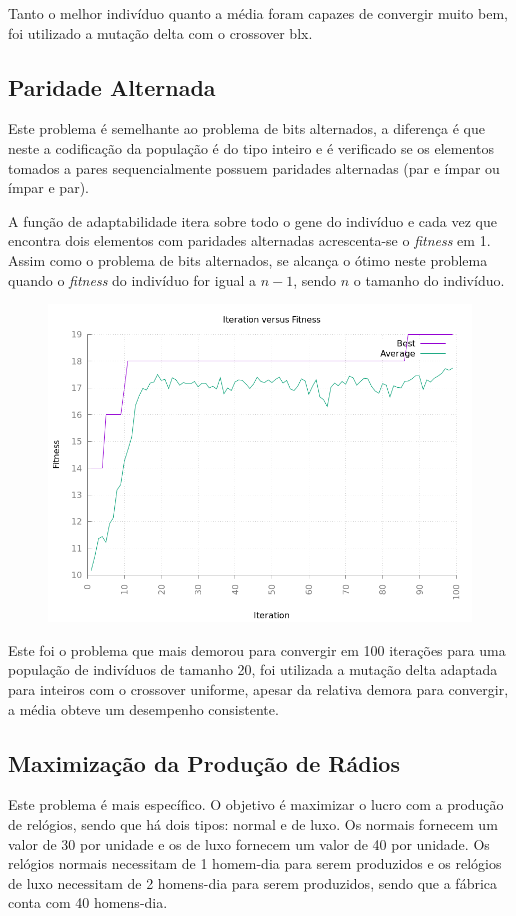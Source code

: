 \documentclass[12pt]{article}
\begin{document}
Tanto o melhor indivíduo quanto a média foram capazes de convergir muito bem, foi utilizado a mutação delta com 
o crossover blx.

\subsection{Paridade Alternada}

Este problema é semelhante ao problema de bits alternados, a diferença é que neste a codificação da população 
é do tipo inteiro e é verificado se os elementos tomados a pares sequencialmente possuem paridades alternadas 
(par e ímpar ou ímpar e par).

A função de adaptabilidade itera sobre todo o gene do indivíduo e cada vez que encontra dois elementos com 
paridades alternadas acrescenta-se o \textit{fitness} em 1. Assim como o problema de bits alternados, 
se alcança o ótimo neste problema quando o \textit{fitness} do indivíduo for igual a $n - 1$, sendo $n$
o tamanho do indivíduo.

\begin{figure}[h!]
    \centering
    \includegraphics[width=.5\textwidth]{pictures/parity}
\end{figure}

Este foi o problema que mais demorou para convergir em 100 iterações para uma população de indivíduos de tamanho 20, 
foi utilizada a mutação delta adaptada para inteiros com o crossover uniforme, apesar da relativa demora para 
convergir, a média obteve um desempenho consistente.

\subsection{Maximização da Produção de Rádios}

Este problema é mais específico. O objetivo é maximizar o lucro com a produção de relógios, sendo que 
há dois tipos: normal e de luxo. Os normais fornecem um valor de 30 por unidade e os de luxo fornecem um 
valor de 40 por unidade. Os relógios normais necessitam de 1 homem-dia para serem produzidos e os 
relógios de luxo necessitam de 2 homens-dia para serem produzidos, sendo que a fábrica conta com 
40 homens-dia. 
\end{document}
